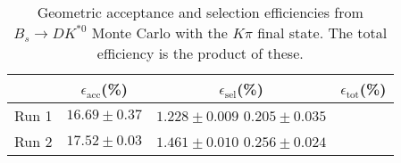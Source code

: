 \begin{table}
    \centering
    \begin{tabular}{cccc}
        \toprule
        & $\epsilon_\mathrm{acc}$(\%) &  $\epsilon_\mathrm{sel}$(\%) &  $\epsilon_\mathrm{tot}$(\%) \\
        \midrule
        Run 1 & $16.69 \pm 0.37$ & $1.228 \pm 0.009$ $0.205 \pm 0.035$ \\
        Run 2 & $17.52 \pm 0.03$ & $1.461 \pm 0.010$ $0.256 \pm 0.024$ \\
        \bottomrule
    \end{tabular}
    \caption{Geometric acceptance and selection efficiencies from  $B_s \to DK^{*0}$ Monte Carlo with the $K\pi$ final state.  The total efficiency is the product of these.}
\label{tab:selection_efficiency_Bs}
\end{table}
